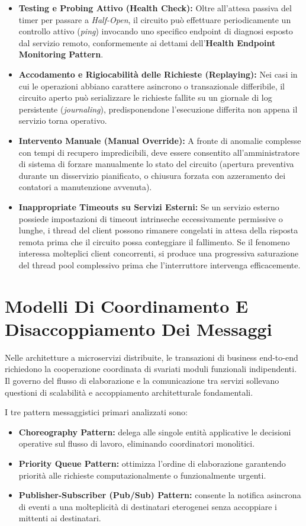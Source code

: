 \documentclass[11pt, a4paper]{article}
\begin{document}
\begin{itemize}
    \item \textbf{Testing e Probing Attivo (Health Check):} Oltre all'attesa passiva del timer per passare a \emph{Half-Open}, il circuito può effettuare periodicamente un controllo attivo (\emph{ping}) invocando uno specifico endpoint di diagnosi esposto dal servizio remoto, conformemente ai dettami dell'\textbf{Health Endpoint Monitoring Pattern}.
    \item \textbf{Accodamento e Rigiocabilità delle Richieste (Replaying):} Nei casi in cui le operazioni abbiano carattere asincrono o transazionale differibile, il circuito aperto può serializzare le richieste fallite su un giornale di log persistente (\emph{journaling}), predisponendone l'esecuzione differita non appena il servizio torna operativo.
    \item \textbf{Intervento Manuale (Manual Override):} A fronte di anomalie complesse con tempi di recupero impredicibili, deve essere consentito all'amministratore di sistema di forzare manualmente lo stato del circuito (apertura preventiva durante un disservizio pianificato, o chiusura forzata con azzeramento dei contatori a manutenzione avvenuta).
    \item \textbf{Inappropriate Timeouts su Servizi Esterni:} Se un servizio esterno possiede impostazioni di timeout intrinseche eccessivamente permissive o lunghe, i thread del client possono rimanere congelati in attesa della risposta remota prima che il circuito possa conteggiare il fallimento. Se il fenomeno interessa molteplici client concorrenti, si produce una progressiva saturazione del thread pool complessivo prima che l'interruttore intervenga efficacemente.
\end{itemize}

\newpage

\section{Modelli Di Coordinamento E Disaccoppiamento Dei Messaggi}

Nelle architetture a microservizi distribuite, le transazioni di business end-to-end richiedono la cooperazione coordinata di svariati moduli funzionali indipendenti. Il governo del flusso di elaborazione e la comunicazione tra servizi sollevano questioni di scalabilità e accoppiamento architetturale fondamentali.

I tre pattern messaggistici primari analizzati sono:
\begin{itemize}[noitemsep]
    \item \textbf{Choreography Pattern:} delega alle singole entità applicative le decisioni operative sul flusso di lavoro, eliminando coordinatori monolitici.
    \item \textbf{Priority Queue Pattern:} ottimizza l'ordine di elaborazione garantendo priorità alle richieste computazionalmente o funzionalmente urgenti.
    \item \textbf{Publisher-Subscriber (Pub/Sub) Pattern:} consente la notifica asincrona di eventi a una molteplicità di destinatari eterogenei senza accoppiare i mittenti ai destinatari.
\end{itemize}
\end{document}
